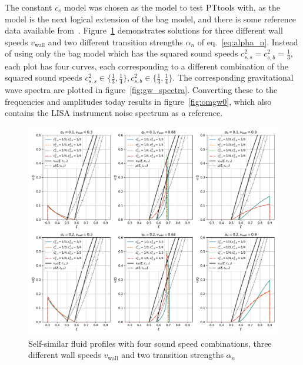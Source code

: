 The constant $c_s$ model was chosen as the model to test PTtools with,
as the model is the next logical extension of the bag model,
and there is some reference data available from~\cites{giese_2020}{giese_2021}.
Figure~\ref{fig:fluid_profiles} demonstrates solutions for three different wall speeds $v_\text{wall}$
and two different transition strengths $\alpha_n$ of eq.~\eqref{eq:alpha_n}.
Instead of using only the bag model which has the squared sound speeds $c_{s,s}^2 = c_{s,b}^2 = \frac{1}{3}$,
each plot has four curves, each corresponding to a different combination of the squared sound speeds
$c_{s,s}^2 \in \{ \frac{1}{3}, \frac{1}{4} \}, c_{s,b}^2 \in \{ \frac{1}{3}, \frac{1}{4} \}$.
The corresponding gravitational wave spectra are plotted in figure~\ref{fig:gw_spectra}.
Converting these to the frequencies and amplitudes today results in figure~\ref{fig:omgw0},
which also contains the LISA instrument noise spectrum as a reference.

\begin{figure}[ht!]
\centering
\includegraphics[width=\textwidth]{fig/const_cs_gw_v.pdf}
\caption{Self-similar fluid profiles with four sound speed combinations, three different wall speeds $v_\text{wall}$ and two transition strengths $\alpha_n$}
\label{fig:fluid_profiles}
\end{figure}

